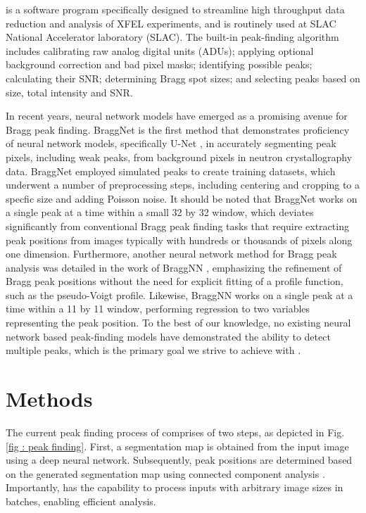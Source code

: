 \documentclass[a4paper]{article}
\begin{document}
\psocake{} is a software program specifically designed to streamline high throughput data reduction and analysis of XFEL experiments, and is routinely used at SLAC National Accelerator laboratory (SLAC).  The built-in peak-finding algorithm \citep{shinDataAnalysisUsing2018} includes calibrating raw analog digital units (ADUs); applying optional background correction and bad pixel masks; identifying possible peaks; calculating their SNR; determining Bragg spot sizes; and selecting peaks based on size, total intensity and SNR.

In recent years, neural network models have emerged as a promising avenue for Bragg peak finding.  BraggNet \citep{sullivanBraggNetIntegratingBragg2019} is the first method that demonstrates proficiency of neural network models, specifically U-Net \citep{ronnebergerUNetConvolutionalNetworks2015}, in accurately segmenting peak pixels, including weak peaks, from background pixels in neutron crystallography data.  BraggNet employed simulated peaks to create training datasets, which underwent a number of preprocessing steps, including centering and cropping to a specfic size and adding Poisson noise.  It should be noted that BraggNet works on a single peak at a time within a small 32 by 32 window, which deviates significantly from conventional Bragg peak finding tasks that require extracting peak positions from images typically with hundreds or thousands of pixels along one dimension.  Furthermore, another neural network method for Bragg peak analysis was detailed in the work of BraggNN \citep{liuBraggNNFastXray2021}, emphasizing the refinement of Bragg peak positions without the need for explicit fitting of a profile function, such as the pseudo-Voigt profile.  Likewise, BraggNN works on a single peak at a time within a 11 by 11 window, performing regression to two variables representing the peak position.  To the best of our knowledge, no existing neural network based peak-finding models have demonstrated the ability to detect multiple peaks, which is the primary goal we strive to achieve with \peaknet{}.


\section{Methods}

The current peak finding process of \peaknet{} comprises of two steps, as depicted in Fig. \ref{fig : peak finding}.  First, a segmentation map is obtained from the input image using a deep neural network.  Subsequently, peak positions are determined based on the generated segmentation map using connected component analysis \citep{weaverCentrosymmetricCrossSymmetricMatrices1985}.  Importantly, \peaknet{} has the capability to process inputs with arbitrary image sizes in batches, enabling efficient analysis.
\end{document}
